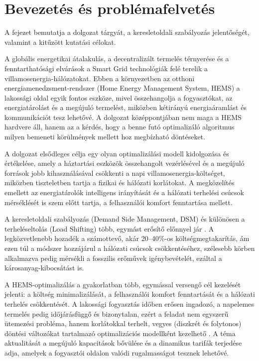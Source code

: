 \chapter{Bevezetés és problémafelvetés}\label{ch:BEVEZETES}

\begin{osszefoglal}
A fejezet bemutatja a dolgozat tárgyát, a keresletoldali szabályozás jelentőségét, valamint a kitűzött kutatási célokat.
\end{osszefoglal}

A globális energetikai átalakulás, a decentralizált termelés térnyerése és a fenntarthatósági elvárások a Smart Grid technológiák felé terelik a villamosenergia-hálózatokat. Ebben a környezetben az otthoni energiamenedzsment-rendszer (Home Energy Management System, HEMS) a lakossági oldal egyik fontos eszköze, mivel összehangolja a fogyasztókat, az energiatárolást és a megújuló termelést, miközben kétirányú energiaáramlást és kommunikációt tesz lehetővé. A dolgozat középpontjában nem maga a HEMS hardvere áll, hanem az a kérdés, hogy a benne futó optimalizáló algoritmus milyen bemeneti körülmények mellett hoz megbízható döntéseket.

A dolgozat elsődleges célja egy olyan optimalizálási modell kidolgozása és értékelése, amely a háztartási eszközök összehangolt vezérlésével és a megújuló források jobb kihasználásával csökkenti a napi villamosenergia-költséget, miközben tiszteletben tartja a fizikai és hálózati korlátokat. A megközelítés emellett az energiatárolók intelligens irányítását és a hálózati terhelési csúcsok mérséklését is szem előtt tartja, a felhasználói komfort fenntartása mellett.

A keresletoldali szabályozás (Demand Side Management, DSM) és különösen a terheléseltolás (Load Shifting) több, egymást erősítő előnnyel jár \cite{Fadaee2012}. A legközvetlenebb hozadék a számottevő, akár 20--40\%-os költségmegtakarítás, ám ezen túl a módszer hozzájárul a hálózati csúcsok csökkentéséhez, szélesebb körben alkalmazva pedig mérsékli a fosszilis erőművek igénybevételét, ezáltal a károsanyag-kibocsátást is.

A HEMS-optimalizálás a gyakorlatban több, egymással versengő cél kezelését jelenti: a költség minimalizálását, a felhasználói komfort fenntartását és a hálózati terhelés csökkentését. A lakossági fogyasztás időben erősen ingadozó, a napelemes termelés pedig időjárásfüggő és bizonytalan, ezért a feladat nem egyszerű ütemezési probléma, hanem korlátokkal terhelt, vegyes (diszkrét és folytonos) döntési változókat tartalmazó optimalizációs modellként kezelhető \cite{Ismail2014, Fadaee2012}. A téma aktualitását a megújuló kapacitások bővülése és a dinamikus tarifák terjedése adja, amelyek a fogyasztói oldalon valódi rugalmasságot tesznek lehetővé.

